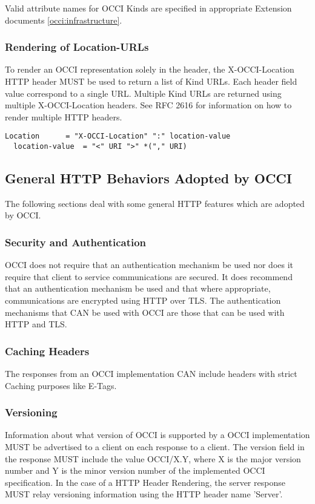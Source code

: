 \documentclass[10pt,a4paper]{article}
\begin{document}
Valid attribute names for OCCI Kinds are specified in appropriate
Extension documents \ref{occi:infrastructure}.

\subsubsection{Rendering of Location-URLs}
To render an OCCI representation solely in the header, the
X-OCCI-Location HTTP header MUST be used to return a list of Kind
URLs. Each header field value correspond to a single URL. Multiple
Kind URLs are returned using multiple X-OCCI-Location headers. See RFC
2616 for information on how to render multiple HTTP headers.

\begin{verbatim}
Location      = "X-OCCI-Location" ":" location-value
  location-value  = "<" URI ">" *("," URI)
\end{verbatim}

\subsection{General HTTP Behaviors Adopted by OCCI}
The following sections deal with some general HTTP features which are
adopted by OCCI.

\subsubsection{Security and Authentication}
OCCI does not require that an authentication mechanism be used nor
does it require that client to service communications are secured. It
does recommend that an authentication mechanism be used and that where
appropriate, communications are encrypted using HTTP over TLS. The
authentication mechanisms that CAN be used with OCCI are those that
can be used with HTTP and TLS.

\subsubsection{Caching Headers}
The responses from an OCCI implementation CAN include headers with
strict Caching purposes like E-Tags.

\subsubsection{Versioning}
Information about what version of OCCI is supported by a OCCI
implementation MUST be advertised to a client on each response to a
client. The version field in the response MUST include the value
OCCI/X.Y, where X is the major version number and Y is the minor
version number of the implemented OCCI specification. In the case of a
HTTP Header Rendering, the server response MUST relay versioning
information using the HTTP header name 'Server'.
\end{document}
